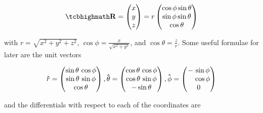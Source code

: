 \begin{equation}
	\mhl{
		\mathbf{R} =
		\begin{pmatrix}
			x \\
			y \\
			z \\
		\end{pmatrix}
		= r
		\begin{pmatrix}
			\cos{\phi}\sin{\theta} \\
			\sin{\phi}\sin{\theta} \\
			\cos{\theta}           \\
		\end{pmatrix}
	}
\end{equation}

with $r=\sqrt{x^2+y^2+z^2}$, $\cos\phi= \frac{x}{\sqrt{x^2+y^2}}$, and $\cos\theta=\frac{z}{r}$.
Some useful formulae for later are the unit vectors

\begin{equation}
	\mathbf{\hat{\text{$r$}}} =
	\begin{pmatrix}
		\sin\theta \, \cos\phi \\
		\sin\theta \, \sin\phi \\
		\cos\theta             \\
	\end{pmatrix},
	\mathbf{\hat{\text{$\theta$}}} =
	\begin{pmatrix}
		\cos\theta \, \cos\phi \\
		\cos\theta \, \sin\phi \\
		- \sin\theta           \\
	\end{pmatrix},
	\mathbf{\hat{\text{$\phi$}}} =
	\begin{pmatrix}
		- \, \sin\phi            \\
		\hphantom{-} \, \cos\phi \\
		0                        \\
	\end{pmatrix}
\end{equation}

and the differentials with respect to each of the coordinates are

